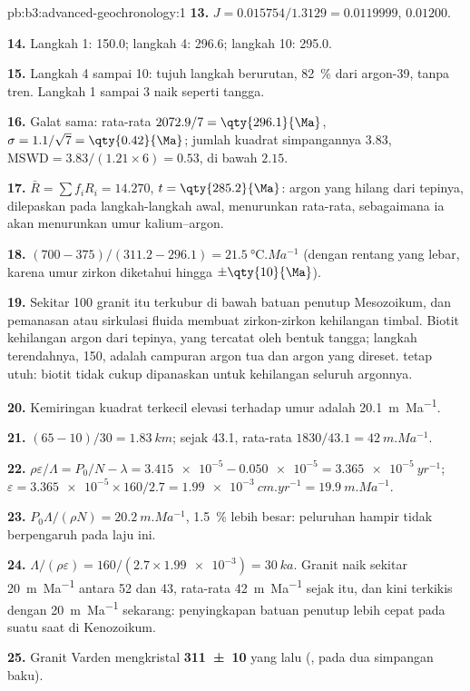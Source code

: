 \begin{solution}{pb:b3:advanced-geochronology:1}
\textbf{13.} $J = 0.015754/1.3129 = 0.0119999$, $0.01200$.

\textbf{14.} Langkah 1: \qty{150.0}{\Ma}; langkah 4: \qty{296.6}{\Ma}; langkah 10:
\qty{295.0}{\Ma}.

\textbf{15.} Langkah 4 sampai 10: tujuh langkah berurutan, \qty{82}{\percent} dari
argon-39, tanpa tren. Langkah 1 sampai 3 naik seperti tangga.

\textbf{16.} Galat sama: rata-rata $2072.9/7 = \qty{296.1}{\Ma}$, $\sigma =
1.1/\sqrt7 = \qty{0.42}{\Ma}$; jumlah kuadrat simpangannya $3.83$,
$\mathrm{MSWD} = 3.83/(1.21\times6) = 0.53$, di bawah $2.15$.

\textbf{17.} $\bar R = \sum f_iR_i = 14.270$, $t = \qty{285.2}{\Ma}$: argon
yang hilang dari tepinya, dilepaskan pada langkah-langkah awal, menurunkan rata-rata, sebagaimana
ia akan menurunkan umur kalium–argon.

\textbf{18.} $(700 - 375)/(311.2 - 296.1) = \qty{21.5}{\celsius.Ma^{-1}}$
(dengan rentang yang lebar, karena umur zirkon diketahui hingga $\pm\qty{10}{\Ma}$).

\textbf{19.} Sekitar \qty{100}{\Ma} granit itu terkubur di bawah batuan
penutup Mesozoikum, dan pemanasan atau sirkulasi fluida membuat zirkon-zirkon kehilangan timbal.
Biotit kehilangan argon dari tepinya, yang tercatat oleh bentuk tangga; langkah
terendahnya, \qty{150}{\Ma}, adalah campuran argon tua dan argon yang direset. 
tetap utuh: biotit tidak cukup dipanaskan untuk kehilangan seluruh argonnya.

\textbf{20.} Kemiringan kuadrat terkecil elevasi terhadap umur adalah
\qty{20.1}{m.Ma^{-1}}.

\textbf{21.} $(65 - 10)/30 = \qty{1.83}{km}$; sejak \qty{43.1}{\Ma}, rata-rata
$1830/43.1 = \qty{42}{m.Ma^{-1}}$.

\textbf{22.} $\rho\varepsilon/\Lambda = P_0/N - \lambda = \num{3.415e-5} -
\num{0.050e-5} = \qty{3.365e-5}{yr^{-1}}$; $\varepsilon = \num{3.365e-5}\times
160/2.7 = \qty{1.99e-3}{cm.yr^{-1}} = \qty{19.9}{m.Ma^{-1}}$.

\textbf{23.} $P_0\Lambda/(\rho N) = \qty{20.2}{m.Ma^{-1}}$, \qty{1.5}{\percent}
lebih besar: peluruhan hampir tidak berpengaruh pada laju ini.

\textbf{24.} $\Lambda/(\rho\varepsilon) = 160/(2.7\times\num{1.99e-3}) =
\qty{30}{ka}$. Granit naik sekitar \qty{20}{m.Ma^{-1}} antara 52 dan
\qty{43}{\Ma}, rata-rata \qty{42}{m.Ma^{-1}} sejak itu, dan kini terkikis dengan
\qty{20}{m.Ma^{-1}} sekarang: penyingkapan batuan penutup lebih cepat pada suatu saat di
Kenozoikum.

\textbf{25.} Granit Varden mengkristal
\textbf{\qty[text-series-to-math=true, separate-uncertainty=true]{311 \pm 10}{\Ma}} yang lalu (,
pada dua simpangan baku).
\end{solution}
